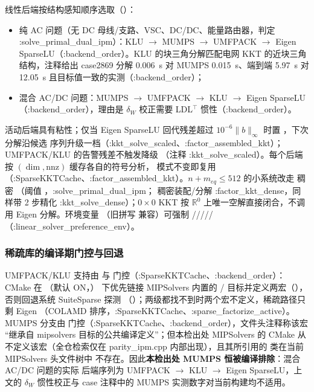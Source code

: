 线性后端按结构感知顺序选取（）：
\begin{itemize}
  \item 纯 AC 问题（无 DC 母线/支路、VSC、DC/DC、能量路由器，判定
        :solve\_primal\_dual\_ipm）：KLU $\to$ MUMPS $\to$ UMFPACK $\to$ Eigen
        SparseLU（:backend\_order）。KLU 的块三角分解匹配电网 KKT 的近块三角
        结构，注释给出 case2869 分解 0.006~s 对 MUMPS 0.015~s、端到端
        5.97~s 对 12.05~s 且目标值一致的实测（:backend\_order）；
  \item 混合 AC/DC 问题：MUMPS $\to$ UMFPACK $\to$ KLU $\to$ Eigen
        SparseLU（:backend\_order），理由是 $\delta_W$ 校正需要 LDL$^{\top}$
        惯性（:backend\_order）。
\end{itemize}
活动后端具有粘性；仅当 Eigen SparseLU 回代残差超过
$10^{-6}\lVert b\rVert_\infty$ 时置 ，下次分解沿候选
序列升级一档（:kkt\_solve\_scaled、:factor\_assembled\_kkt）；UMFPACK/KLU 的告警残差不触发降级
（注释 :kkt\_solve\_scaled）。每个后端按 $(\dim,\mathrm{nnz})$ 缓存各自的符号分析，
模式不变即复用（:SparseKKTCache、:factor\_assembled\_kkt）。$n+m_{eq}\le512$ 的小系统改走
稠密 （阈值 ，:solve\_primal\_dual\_ipm；
稠密装配/分解 :factor\_kkt\_dense，同样带 2 步精化 :kkt\_solve\_dense）；$0\times0$
KKT 按 $\mathbb R^0$ 上唯一空解直接闭合，不调用 Eigen 分解。环境变量
（旧拼写
 兼容）可强制
/////
（:linear\_solver\_preference\_env）。

\subsubsection*{稀疏库的编译期门控与回退}
UMFPACK/KLU 支持由  与
 门控（:SparseKKTCache、:backend\_order）：CMake 在
（默认 ON，）
下优先链接 MIPSolvers 内置的 /
目标并定义两宏（），否则回退系统 SuiteSparse 探测
（）；两级都找不到时两个宏不定义，稀疏路径只剩
Eigen （COLAMD 排序，:SparseKKTCache、:sparse\_factorize\_active）。MUMPS 分支由
 门控（:SparseKKTCache、:backend\_order），文件头注释称该宏
“继承自 mipsolvers 目标的公共编译定义”；但本检出处 MIPSolvers 的 CMake
从不定义该宏（全仓检索仅在 parity\_ipm.cpp 内部出现），且其所引用的
 类在当前 MIPSolvers 头文件树中
不存在。因此\textbf{本检出处 MUMPS 恒被编译排除}：混合 AC/DC 问题的实际
后端序列为 UMFPACK $\to$ KLU $\to$ Eigen SparseLU，上文的 $\delta_W$
惯性校正与 case 注释中的 MUMPS 实测数字对当前构建均不适用。

